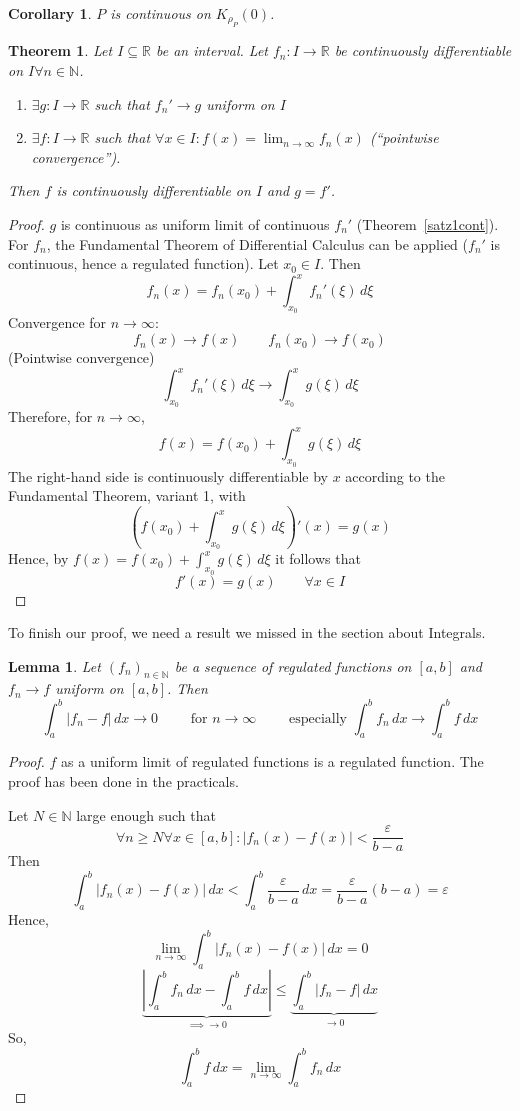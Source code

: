 \documentclass{article}
\newtheorem{theorem}{Theorem}  \numberwithin{theorem}{section}
\newtheorem{lemma}{Lemma}  \numberwithin{lemma}{section}
\newtheorem*{corollary}{Corollary}%
\newcommand{\card}[1]{\left|#1\right|}
\begin{document}
\begin{corollary}
  $P$ is continuous on $K_{\rho_P}(0)$.
\end{corollary}

\begin{theorem}
  Let $I \subseteq \mathbb R$ be an interval.
  Let $f_n: I \to \mathbb R$ be continuously differentiable on $I \forall n \in \mathbb N$.
  \begin{enumerate}
    \item $\exists g: I \to \mathbb R$ such that $f_n' \to g$ uniform on $I$
    \item $\exists f: I \to \mathbb R$ such that $\forall x \in I: f(x) = \lim_{n\to\infty} f_n(x)$ (\enquote{pointwise convergence}).
  \end{enumerate}
  Then $f$ is continuously differentiable on $I$ and $g = f'$.
\end{theorem}

\begin{proof}
  $g$ is continuous as uniform limit of continuous $f_n'$ (Theorem~\ref{satz1cont}).
  For $f_n$, the Fundamental Theorem of Differential Calculus can be applied ($f_n'$ is continuous, hence a regulated function).
  Let $x_0 \in I$. Then
  \[ f_n(x) = f_n(x_0) + \int_{x_0}^x f_n'(\xi) \, d\xi \]
  Convergence for $n \to \infty$:
  \[ f_n(x) \to f(x) \qquad f_n(x_0) \to f(x_0) \]
  (Pointwise convergence)
  \[ \int_{x_0}^x f_n'(\xi) \, d\xi \to \int_{x_0}^x g(\xi) \, d\xi \]
  Therefore, for $n \to \infty$,
  \[ f(x) = f(x_0) + \int^x_{x_0} g(\xi) \, d\xi \]
  The right-hand side is continuously differentiable by $x$ according to the Fundamental Theorem, variant 1,
  with
  \[ \left(f(x_0) + \int_{x_0}^x g(\xi) \, d\xi\right)'(x) = g(x) \]
  Hence, by $f(x) = f(x_0) + \int^x_{x_0} g(\xi) \, d\xi$ it follows that
  \[ f'(x) = g(x) \qquad \forall x \in I \]
\end{proof}

To finish our proof, we need a result we missed in the section about Integrals.

\begin{lemma}
  Let $(f_n)_{n \in \mathbb N}$ be a sequence of regulated functions on $[a,b]$ and
  $f_n \to f$ uniform on $[a,b]$. Then
  \[ \int_a^b \card{f_n - f} \, dx \to 0 \qquad \text{ for } n \to \infty \qquad \text{ especially } \int_a^b f_n \, dx \to \int_a^b f \, dx \]
\end{lemma}

\begin{proof}
  $f$ as a uniform limit of regulated functions is a regulated function.
  The proof has been done in the practicals.

  Let $N \in \mathbb N$ large enough such that
  \[ \forall n \geq N \forall x \in [a,b]: \card{f_n(x) - f(x)} < \frac{\varepsilon}{b - a} \]
  Then
  \[ \int_a^b \card{f_n(x) - f(x)} \, dx < \int_a^b \frac{\varepsilon}{b - a} \, dx = \frac{\varepsilon}{b - a} (b - a) = \varepsilon \]
  Hence,
  \[ \lim_{n\to\infty} \int_a^b \card{f_n(x) - f(x)} \, dx = 0 \]
  \[ \underbrace{\card{\int_a^b f_n \, dx - \int_a^b f \, dx}}_{\implies \to 0 } \leq \underbrace{\int_a^b \card{f_n - f} \, dx}_{\to 0} \]
  So,
  \[ \int_a^b f \, dx = \lim_{n\to\infty} \int_a^b f_n \, dx \]
\end{proof}
\end{document}
